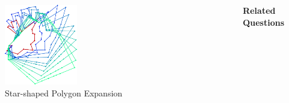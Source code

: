 \documentclass{beamer}
\begin{document}
\begin{frame}
\begin{columns}[t]
        \renewcommand{\thefigure}{2c}
        \begin{figure}
            \centering
            \includegraphics[width=0.36\textwidth]{figures/rand_poly.png}
            \caption{Star-shaped Polygon Expansion}
            \label{fig:star_exp}
        \end{figure}
        \vspace{0pt}
        
        {\centering \large \textbf{Related Questions} \\}
        

\end{columns}
\end{frame}
\end{document}
